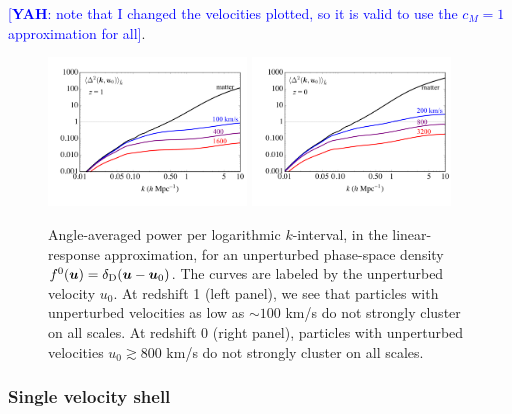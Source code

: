 \documentclass[useAMS, usenatbib]{mnras}
\newcommand{\bs}{\boldsymbol}
\newcommand{\spb}[1]{{\textcolor{green}{[{\bf SPB}: #1]}}}
\newcommand{\yah}[1]{{\textcolor{blue}{[{\bf YAH}: #1]}}}
\begin{document}
\yah{note that I changed the velocities plotted, so it is valid to use the $c_M = 1$ approximation for all}.


\begin{figure}
\includegraphics[width=0.47\textwidth]{nuplots/lin_resp_z1.pdf}
\includegraphics[width=0.47\textwidth]{nuplots/lin_resp_z0.pdf}
\caption{Angle-averaged power per logarithmic $k$-interval, in the linear-response approximation, for an unperturbed phase-space density $f^0(\bs{u}) = \delta_{\rm D}(\bs{u}- \bs{u}_0)$. The curves are labeled by the unperturbed velocity $u_0$. At redshift 1 (left panel), we see that particles with unperturbed velocities as low as $\sim 100$ km/s do not strongly cluster on all scales. At redshift 0 (right panel), particles with unperturbed velocities $u_0 \gtrsim 800$ km/s do not strongly cluster on all scales.}
\label{fig:halofitvshell}
\end{figure}


\subsubsection{Single velocity shell}

\end{document}
